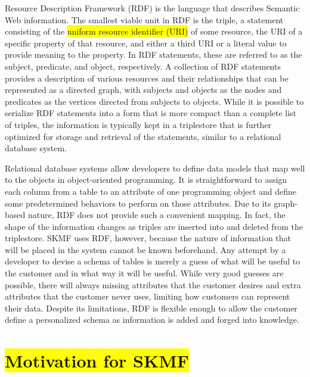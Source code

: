 Resource Description Framework
\cite{rdf}
(RDF) is the language that describes Semantic Web information. The smallest viable unit in RDF is the triple, a statement consisting of the
\colorbox{yellow}{uniform resource identifier (URI)}
of some resource, the URI of a specific property of that resource, and either a third URI or a literal value to provide meaning to the property. In RDF statements, these are referred to as the subject, predicate, and object, respectively. A collection of RDF statements provides a description of various resources and their relationships that can be represented as a directed graph, with subjects and objects as the nodes and predicates as the vertices directed from subjects to objects. While it is possible to serialize RDF statements into a form that is more compact than a complete list of triples, the information is typically kept in a triplestore that is further optimized for storage and retrieval of the statements, similar to a relational database system.

Relational database systems allow developers to define data models that map well to the objects in object-oriented programming. It is straightforward to assign each column from a table to an attribute of one programming object and define some predetermined behaviors to perform on those attributes. Due to its graph-based nature, RDF does not provide such a convenient mapping. In fact, the shape of the information changes as triples are inserted into and deleted from the triplestore. SKMF uses RDF, however, because the nature of information that will be placed in the system cannot be known beforehand. Any attempt by a developer to devise a schema of tables is merely a guess of what will be useful to the customer and in what way it will be useful. While very good guesses are possible, there will always missing attributes that the customer desires and extra attributes that the customer never uses, limiting how customers can represent their data. Despite its limitations, RDF is flexible enough to allow the customer define a personalized schema as information is added and forged into knowledge.


\section{\colorbox{yellow}{Motivation for SKMF}}
\label{intro:motive}

